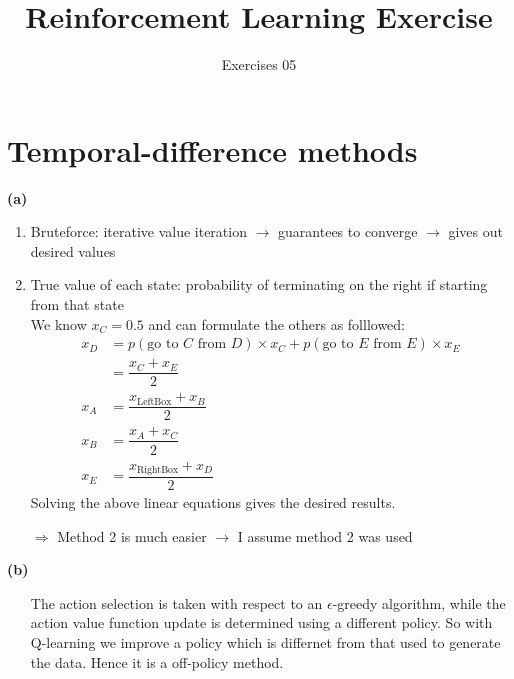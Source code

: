 \documentclass[11pt,a4paper]{scrartcl}
\author{}
\title{Reinforcement Learning Exercise}
\subtitle{Exercises 05}
\date{}
\begin{document}
\maketitle

\section{Temporal-difference methods}

\vspace{0.5cm}
\textbf{(a)}
\begin{enumerate}
\item Bruteforce: iterative value iteration $\rightarrow$ guarantees to converge $\rightarrow$ gives out desired values

\item True value of each state: probability  of  terminating  on  the  right  if starting from that state\\
We know $x_C = 0.5$ and can formulate the others as folllowed:
\begin{align*}
x_D &= p(\text{go to }C\text{ from }D) \times x_C + p(\text{go to }E\text{ from }E) \times x_E\\
&= \dfrac{x_C + x_E}{2}\\
x_A &= \dfrac{x_{\text{LeftBox}} + x_B}{2}\\
x_B &= \dfrac{x_A + x_C}{2}\\
x_E &= \dfrac{x_{\text{RightBox}} + x_D}{2}
\end{align*}
Solving the above linear equations gives the desired results.
\end{enumerate}
\vspace{0.2cm}
\begin{itemize}
\item[$\Rightarrow$] Method 2 is much easier $\rightarrow$ I assume method 2 was used
\end{itemize}



\vspace{0.5cm}
\textbf{(b)}
\begin{itemize}
\item[] The action selection is taken with respect to an $\epsilon$-greedy algorithm, while the action value function update is determined using a different policy. So with Q-learning we improve a policy which is differnet from that used to generate the data. Hence it is a off-policy method.
\end{itemize}
\end{document}
